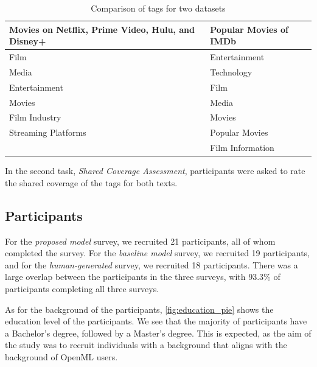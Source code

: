 \begin{table}[h]
    \centering
    \begin{tabular}{|>{\raggedright\arraybackslash}p{6cm}|>{\raggedright\arraybackslash}p{6cm}|}
        \hline
        \textbf{Movies on Netflix, Prime Video, Hulu, and Disney+} & \textbf{Popular Movies of IMDb} \\ \hline
        Film                                                       & Entertainment                   \\ \hline
        Media                                                      & Technology                      \\ \hline
        Entertainment                                              & Film                            \\ \hline
        Movies                                                     & Media                           \\ \hline
        Film Industry                                              & Movies                          \\ \hline
        Streaming Platforms                                        & Popular Movies                  \\ \hline
                                                                   & Film Information                \\ \hline
    \end{tabular}
    \caption{Comparison of tags for two datasets}
    \label{tab:tag_comparison_two_datasets}
\end{table}


In the second task, \textit{Shared Coverage Assessment}, participants were asked to rate the shared coverage of the tags for both texts.

\subsection{Participants}
For the \textit{proposed model} survey, we recruited 21 participants, all of whom completed the survey. For the \textit{baseline model} survey, we recruited 19 participants, and for the \textit{human-generated} survey, we recruited 18 participants. There was a large overlap between the participants in the three surveys, with 93.3\% of participants completing all three surveys.

As for the background of the participants, \cref{fig:education_pie} shows the education level of the participants. We see that the majority of participants have a Bachelor's degree, followed by a Master's degree. This is expected, as the aim of the study was to recruit individuals with a background that aligns with the background of OpenML users.


